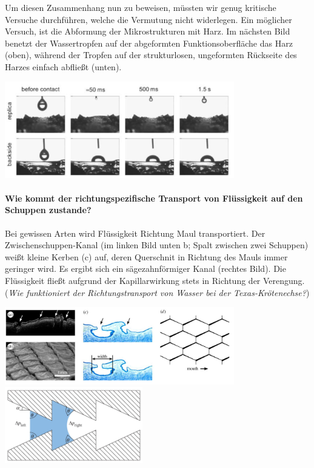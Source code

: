 Um diesen Zusammenhang nun zu beweisen, müssten wir genug kritische Versuche durchführen, welche die Vermutung nicht widerlegen. Ein möglicher Versuch, ist die Abformung der Mikrostrukturen mit Harz. Im nächsten Bild benetzt der Wassertropfen auf der abgeformten Funktionsoberfläche das Harz (oben), während der Tropfen auf der strukturlosen, ungeformten Rückseite des Harzes einfach abfließt (unten).

\begin{center}
    \includegraphics[width=10cm]{lec3/figures/Resin.png}
\end{center}

\paragraph{Wie kommt der richtungspezifische Transport von Flüssigkeit auf den Schuppen zustande?} Bei gewissen Arten wird Flüssigkeit Richtung Maul transportiert. Der Zwischenschuppen-Kanal (im linken Bild unten b; Spalt zwischen zwei Schuppen) weißt kleine Kerben (c) auf, deren Querschnit in Richtung des Mauls immer geringer wird. Es ergibt sich ein sägezahnförmiger Kanal (rechtes Bild). Die Flüssigkeit fließt aufgrund der Kapillarwirkung stets in Richtung der Verengung. (\dangersign \textit{Wie funktioniert der Richtungstransport von Wasser bei der Texas-Krötenechse?}) 

\begin{center}
    \includegraphics[width=10cm]{lec3/figures/Kerben.png}
    \hfill
    \includegraphics[width=6cm]{lec3/figures/Kanal.png}
\end{center}

